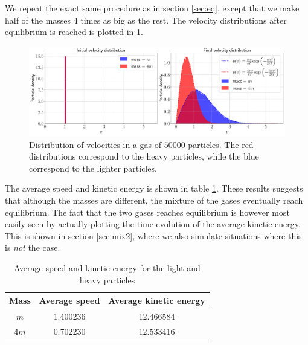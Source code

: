 We repeat the exact same procedure as in section \ref{sec:eq}, except that we make half of the masses $4$ times as big as the rest. The velocity distributions after equilibrium is reached is plotted in \ref{fig:dist_3}.

\begin{figure}[htb]
	\centering
	\includegraphics[width=\textwidth]{../fig/distribution_2}
	\caption{Distribution of velocities in a gas of $50000$ particles. The red distributions correspond to the heavy particles, while the blue correspond to the lighter particles.}
	\label{fig:dist_3}
\end{figure}

The average speed and kinetic energy is shown in table \ref{tab:averages}. These results suggests that although the masses are different, the mixture of the gases eventually reach equilibrium. The fact that the two gases reaches equilibrium is however most easily seen by actually plotting the time evolution of the average kinetic energy. This is shown in section \ref{sec:mix2}, where we also simulate situations where this is \textit{not} the case.

\begin{table}[htb]
	\centering 
	\caption{Average speed and kinetic energy for the light and heavy particles}
	\begin{tabular}{ccc}
		\hline
		\textbf{Mass }& \textbf{Average speed} & \textbf{Average kinetic energy} \\
		\hline 
		$m$   & 1.400236 & 12.466584 \\
		$4m$  & 0.702230 & 12.533416 \\
		\hline 
	\end{tabular}
	\label{tab:averages}
\end{table}
